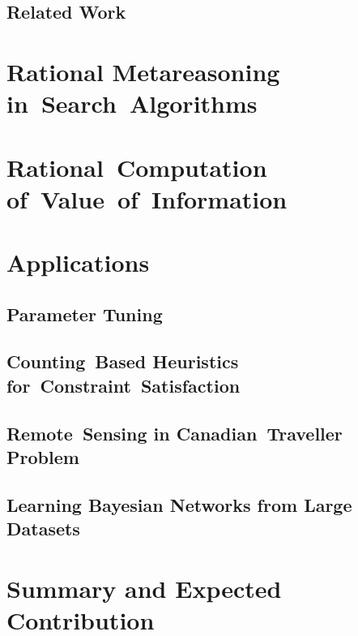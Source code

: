 \documentclass[oneside]{report}
\begin{document}
\section{Related Work}
\label{sec:related}


\chapter{Rational Metareasoning in~Search~Algorithms}
\label{ch:ramesrch}


\chapter{Rational~Computation of~Value~of~Information}
\label{ch:raticomp}


\chapter{Applications}
\label{ch:applications}

\section{Parameter Tuning}
\label{sec:app-apt}


\section{Counting~Based Heuristics for~Constraint~Satisfaction}
\label{sec:app-csp}


\section{Remote~Sensing in Canadian~Traveller Problem}
\label{sec:app-ctp}


\section{Learning Bayesian Networks from Large Datasets}
\label{sec:app-bnlearn}


\chapter {Summary and Expected Contribution}
\label{ch:summary}




\end{document}
